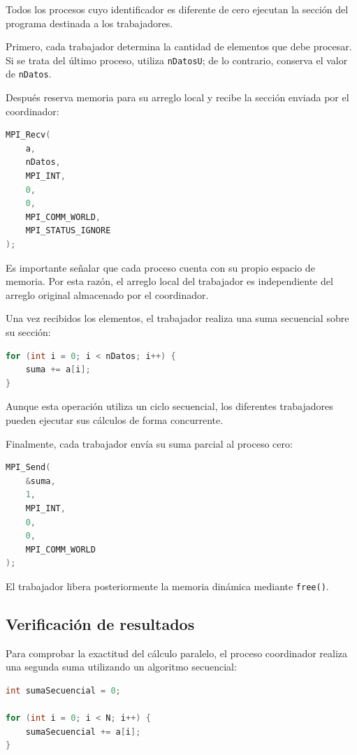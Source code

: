 \documentclass[12pt,a4paper]{article}
\begin{document}
Todos los procesos cuyo identificador es diferente de cero ejecutan la sección del programa destinada a los trabajadores.

Primero, cada trabajador determina la cantidad de elementos que debe procesar. Si se trata del último proceso, utiliza \texttt{nDatosU}; de lo contrario, conserva el valor de \texttt{nDatos}.

Después reserva memoria para su arreglo local y recibe la sección enviada por el coordinador:

\begin{lstlisting}[language=C]
MPI_Recv(
    a,
    nDatos,
    MPI_INT,
    0,
    0,
    MPI_COMM_WORLD,
    MPI_STATUS_IGNORE
);
\end{lstlisting}

Es importante señalar que cada proceso cuenta con su propio espacio de memoria. Por esta razón, el arreglo local del trabajador es independiente del arreglo original almacenado por el coordinador.

Una vez recibidos los elementos, el trabajador realiza una suma secuencial sobre su sección:

\begin{lstlisting}[language=C]
for (int i = 0; i < nDatos; i++) {
    suma += a[i];
}
\end{lstlisting}

Aunque esta operación utiliza un ciclo secuencial, los diferentes trabajadores pueden ejecutar sus cálculos de forma concurrente.

Finalmente, cada trabajador envía su suma parcial al proceso cero:

\begin{lstlisting}[language=C]
MPI_Send(
    &suma,
    1,
    MPI_INT,
    0,
    0,
    MPI_COMM_WORLD
);
\end{lstlisting}

El trabajador libera posteriormente la memoria dinámica mediante \texttt{free()}.

\subsection{Verificación de resultados}

Para comprobar la exactitud del cálculo paralelo, el proceso coordinador realiza una segunda suma utilizando un algoritmo secuencial:

\begin{lstlisting}[language=C]
int sumaSecuencial = 0;

for (int i = 0; i < N; i++) {
    sumaSecuencial += a[i];
}
\end{lstlisting}
\end{document}
